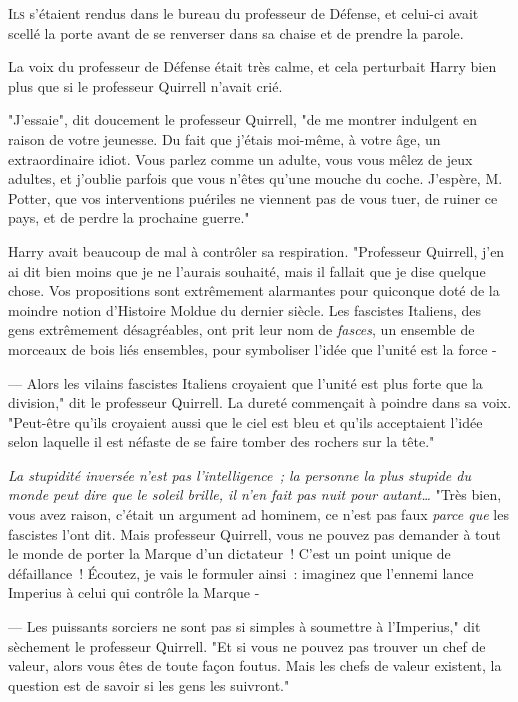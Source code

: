 
\lettrine{I}{ls} s'étaient rendus dans le bureau du professeur de Défense, et celui-ci avait scellé la porte avant de se renverser dans sa chaise et de prendre la parole.

La voix du professeur de Défense était très calme, et cela perturbait Harry bien plus que si le professeur Quirrell n'avait crié.

"J'essaie", dit doucement le professeur Quirrell, "de me montrer indulgent en raison de votre jeunesse. Du fait que j'étais moi-même, à votre âge, un extraordinaire idiot. Vous parlez comme un adulte, vous vous mêlez de jeux adultes, et j'oublie parfois que vous n'êtes qu'une mouche du coche. J'espère, M. Potter, que vos interventions puériles ne viennent pas de vous tuer, de ruiner ce pays, et de perdre la prochaine guerre."

Harry avait beaucoup de mal à contrôler sa respiration. "Professeur Quirrell, j'en ai dit bien moins que je ne l'aurais souhaité, mais il fallait que je dise quelque chose. Vos propositions sont extrêmement alarmantes pour quiconque doté de la moindre notion d'Histoire Moldue du dernier siècle. Les fascistes Italiens, des gens extrêmement désagréables, ont prit leur nom de \emph{fasces}, un ensemble de morceaux de bois liés ensembles, pour symboliser l'idée que l'unité est la force -

--- Alors les vilains fascistes Italiens croyaient que l'unité est plus forte que la division," dit le professeur Quirrell. La dureté commençait à poindre dans sa voix. "Peut-être qu'ils croyaient aussi que le ciel est bleu et qu'ils acceptaient l'idée selon laquelle il est néfaste de se faire tomber des rochers sur la tête."

\emph{La stupidité inversée n'est pas l'intelligence~; la personne la plus stupide du monde peut dire que le soleil brille, il n'en fait pas nuit pour autant…} "Très bien, vous avez raison, c'était un argument ad hominem, ce n'est pas faux \emph{parce que} les fascistes l'ont dit. Mais professeur Quirrell, vous ne pouvez pas demander à tout le monde de porter la Marque d'un dictateur~! C'est un point unique de défaillance~! Écoutez, je vais le formuler ainsi~: imaginez que l'ennemi lance Imperius à celui qui contrôle la Marque -

--- Les puissants sorciers ne sont pas si simples à soumettre à l'Imperius," dit sèchement le professeur Quirrell. "Et si vous ne pouvez pas trouver un chef de valeur, alors vous êtes de toute façon foutus. Mais les chefs de valeur existent, la question est de savoir si les gens les suivront."

